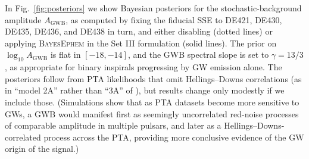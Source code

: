\documentclass[iop,apj,twocolappendix]{emulateapj}
\begin{document}
In Fig.\ \ref{fig:posteriors} we show Bayesian posteriors for the stochastic-background amplitude $A_\mathrm{GWB}$, as computed by fixing the fiducial SSE to DE421, DE430, DE435, DE436, and DE438 in turn, and either disabling (dotted lines) or applying \textsc{BayesEphem} in the Set III formulation (solid lines). The prior on $\log_{10} A_\mathrm{GWB}$ is flat in $[-18,-14]$, and the GWB spectral slope is set to $\gamma = 13/3$, as appropriate for binary inspirals progressing by GW emission alone. The posteriors follow from PTA likelihoods that omit Hellings--Downs correlations (as in ``model 2A'' rather than ``3A'' of \citealt{2018ApJ...859...47A}), but results change only modestly if we include those.
(Simulations show that as PTA datasets become more sensitive to GWs, a GWB would manifest first as seemingly uncorrelated red-noise processes of comparable amplitude in multiple pulsars, and later as a Hellings--Downs-correlated process across the PTA, providing more conclusive evidence of the GW origin of the signal.)
\end{document}
